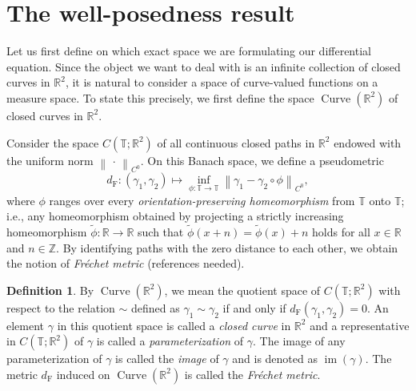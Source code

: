 \documentclass[reqno,centertags,12pt]{amsart}
\theoremstyle{definition}
\newtheorem{definition}[theorem]{Definition}
\numberwithin{equation}{section}
\newcommand{\norm}[1]{\left\|#1\right\|}
\newcommand{\bbR}{{\mathbb{R}}}
\newcommand{\bbZ}{{\mathbb{Z}}}
\newcommand{\bbT}{{\mathbb{T}}}
\begin{document}
\section{The well-posedness result} \label{S2}

Let us first define on which exact space we are formulating our
differential equation. Since the object we want to deal with is an
infinite collection of closed curves in $\bbR^{2}$, it is natural to consider
a space of curve-valued functions on a measure space. To state this precisely,
we first define the space $\operatorname{Curve}(\bbR^{2})$ of closed curves in $\bbR^{2}$.

Consider the space $C(\bbT;\bbR^{2})$ of all
continuous closed paths in $\bbR^{2}$ endowed with the uniform norm
$\norm{\,\cdot\,}_{C^{0}}$. On this Banach space, we define a pseudometric
\[
    d_{\mathrm{F}}\colon (\gamma_{1},\gamma_{2})\mapsto
    \inf_{\phi\colon \bbT\to \bbT}
    \norm{\gamma_{1} - \gamma_{2}\circ\phi}_{C^{0}},
\]
where $\phi$ ranges over every \emph{orientation-preserving homeomorphism}
from $\bbT$ onto $\bbT$; i.e., any homeomorphism obtained by projecting a
strictly increasing homeomorphism $\tilde{\phi}\colon \bbR\to \bbR$ such that
$\tilde{\phi}(x+n) = \tilde{\phi}(x)+n$ holds for all $x\in\bbR$ and $n\in\bbZ$.
By identifying paths with the zero distance to each other, we obtain the notion of
\emph{Fr\'{e}chet metric} (references needed).

\begin{definition}\label{D2.1}
    By $\operatorname{Curve}(\bbR^{2})$, we mean the quotient space of
    $C(\bbT;\bbR^{2})$ with respect to the relation $\sim$ defined as
    $\gamma_{1}\sim\gamma_{2}$ if and only if $d_{\mathrm{F}}(\gamma_{1},\gamma_{2}) = 0$.
    An element $\gamma$ in this quotient space is called a \emph{closed curve} in $\bbR^{2}$
    and a representative in $C(\bbT;\bbR^{2})$ of $\gamma$ is called
    a \emph{parameterization} of $\gamma$. The image of any parameterization of $\gamma$
    is called the \emph{image} of $\gamma$ and is denoted as $\operatorname{im}(\gamma)$.
    The metric $d_{\mathrm{F}}$ induced on $\operatorname{Curve}(\bbR^{2})$ is called
    the \emph{Fr\'{e}chet metric}.
\end{definition}
\end{document}
